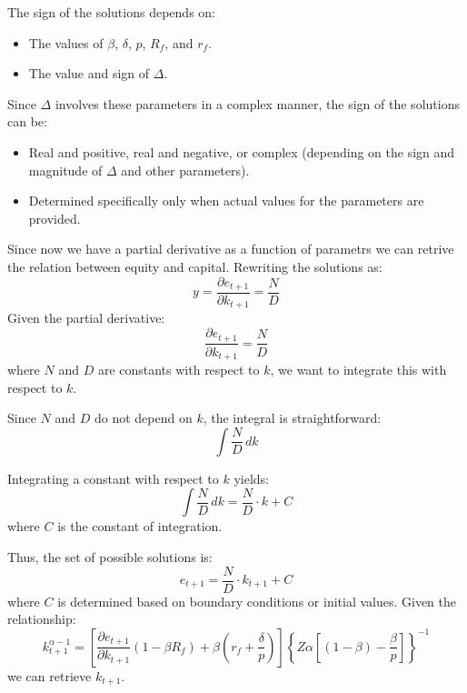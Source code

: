 \documentclass[12pt]{article}
\begin{document}
The sign of the solutions depends on:
\begin{itemize}
    \item The values of \( \beta \), \( \delta \), \( p \), \( R_f \), and \( r_f \).
    \item The value and sign of \( \Delta \).
\end{itemize}
Since \( \Delta \) involves these parameters in a complex manner, the sign of the solutions can be:
\begin{itemize}
    \item Real and positive, real and negative, or complex (depending on the sign and magnitude of \( \Delta \) and other parameters).
    \item Determined specifically only when actual values for the parameters are provided.
\end{itemize}
Since now we have a partial derivative as a function of parametrs we can retrive the relation between equity and
capital.
Rewriting the solutions as:
\[y =\frac{\partial e_{t+1}}{\partial k_{t+1}}= \frac{N}{D}\]
Given the partial derivative:
\begin{equation}
    \frac{\partial e_{t+1}}{\partial k_{t+1}} = \frac{N}{D}
\end{equation}
where \(N\) and \(D\) are constants with respect to \(k\), we want to integrate this with respect to \(k\).

Since \(N\) and \(D\) do not depend on \(k\), the integral is straightforward:
\begin{equation}
    \int \frac{N}{D} \, dk
\end{equation}

Integrating a constant with respect to \(k\) yields:
\begin{equation}
    \int \frac{N}{D} \, dk = \frac{N}{D} \cdot k + C
\end{equation}
where \(C\) is the constant of integration.

Thus, the set of possible solutions is:
\begin{equation}
    e_{t+1} = \frac{N}{D} \cdot k_{t+1} + C
\end{equation}
where \(C\) is determined based on boundary conditions or initial values.
Given the relationship:
\begin{equation}
    k^{\alpha-1}_{t+1} = \left[\frac{\partial e_{t+1}}{\partial k_{t+1}}\left(1-\beta R_f\right) + \beta \left(r_f+\frac{\delta}{p}\right)\right]\left\{Z\alpha\left[\left(1-\beta\right)-\frac{\beta}{p}\right]\right\}^{-1}
\end{equation}
we can retrieve \(k_{t+1}\).
\end{document}

